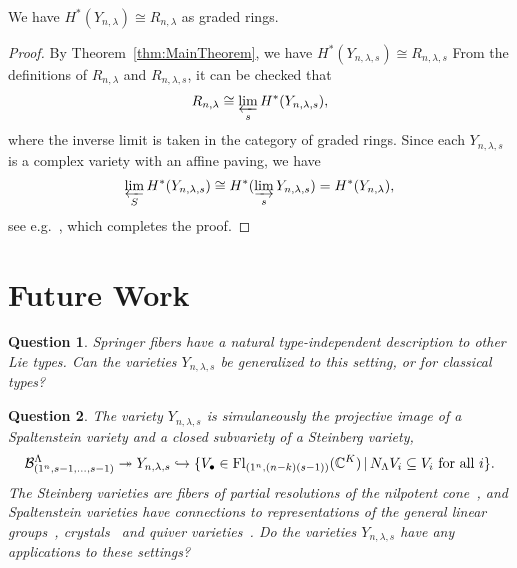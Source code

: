\documentclass[12pt]{amsart}
\newcommand{\st}{\,|\,}
\newcommand{\Fl}{\mathrm{Fl}}
\newcommand{\la}{\lambda}
\newcommand{\Hom}{\mathrm{Hom}}
\newtheorem{question}{Question}
\begin{document}


\begin{theorem}
We have $H^*(Y_{n,\la})\cong R_{n,\la}$ as graded rings.
\end{theorem}

\begin{proof}
By Theorem~\ref{thm:MainTheorem}, we have $H^*(Y_{n,\lambda,s})\cong R_{n,\la,s}$ From the definitions of $R_{n,\la}$ and $R_{n,\la,s}$, it can be checked that
\begin{align}
R_{n,\la} \cong \varprojlim_s H^*(Y_{n,\la,s}),
\end{align}
where the inverse limit is taken in the category of graded rings. Since each $Y_{n,\la,s}$ is a complex variety with an affine paving, we have
\begin{align}
  \varprojlim_S H^*(Y_{n,\la,s}) \cong H^*(\varinjlim_s Y_{n,\la,s}) = H^*(Y_{n,\la}),
\end{align}
see e.g.~\cite[Lemma 7.2]{Pawlowski-Rhoades}, which completes the proof.
\end{proof}





\section{Future Work}\label{sec:FutureWork}

\begin{question}
Springer fibers have a natural type-independent description to other Lie types. Can the varieties $Y_{n,\la,s}$ be generalized to this setting, or for classical types?
\end{question}

\begin{question}
  The variety $Y_{n,\la,s}$ is simulaneously the projective image of a Spaltenstein variety and a closed subvariety of a Steinberg variety,
  \[
\cB_{(1^n,s-1,\dots,s-1)}^\Lambda \twoheadrightarrow Y_{n,\la,s}\hookrightarrow \{V_\bullet\in \Fl_{(1^n,(n-k)(s-1))}(\bC^K) \st N_\Lambda V_i\subseteq V_i \text{ for all }i\}.
\]
The Steinberg varieties are fibers of partial resolutions of the nilpotent cone~\cite{Goresky-Macpherson}, and Spaltenstein varieties have connections to representations of the general linear groups~\cite{Braverman-Gaitsgory}, crystals~\cite{Malik} and quiver varieties~\cite{Nakajima1,Nakajima2}. Do the varieties $Y_{n,\la,s}$ have any applications to these settings?
\end{question}
\end{document}
